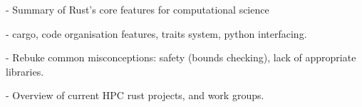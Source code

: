 - Summary of Rust's core features for computational science

- cargo, code organisation features, traits system, python interfacing.

- Rebuke common misconceptions: safety (bounds checking), lack of appropriate libraries.

- Overview of current HPC rust projects, and work groups.

